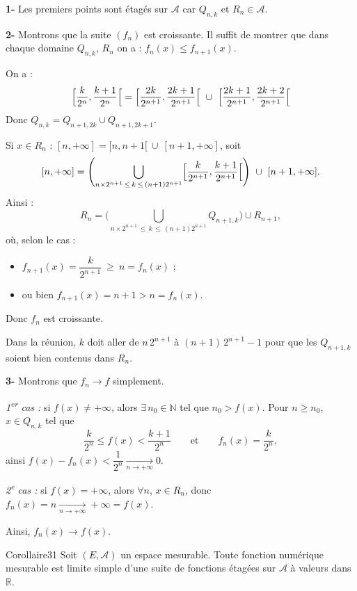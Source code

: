 \documentclass[11pt,a4paper]{article}
\newcommand{\R}{\mathbb{R}}
\newcommand{\N}{\mathbb{N}}
\newcommand{\A}{\mathscr{A}}
\begin{document}
\textbf{1-} Les premiers points sont étagés sur $\A$ car $Q_{n,k}$ et $R_n\in\A$.

\textbf{2-} Montrons que la suite $(f_n)$ est croissante. Il suffit de montrer que dans chaque domaine
$Q_{n,k}$, $R_n$ on a : $f_n(x)\le f_{n+1}(x)$.

On a :
\[
  \Bigl[\frac{k}{2^n},\frac{k+1}{2^n}\Bigr[
  =\Bigl[\frac{2k}{2^{n+1}},\frac{2k+1}{2^{n+1}}\Bigr[\ \cup\ \Bigl[\frac{2k+1}{2^{n+1}},\frac{2k+2}{2^{n+1}}\Bigr[
\]
Donc $Q_{n,k}=Q_{n+1,2k}\cup Q_{n+1,2k+1}$.

Si $x\in R_n$ : $[n,+\infty]=[n,n+1[\ \cup\ [n+1,+\infty]$, soit
\[
  [n,+\infty]=\Biggl(\bigcup_{n\times 2^{n+1}\,\le\,k\,\le\,(n+1)2^{n+1}}
  \Bigl[\frac{k}{2^{n+1}},\frac{k+1}{2^{n+1}}\Bigr[\Biggr)\ \cup\ [n+1,+\infty].
\]
Ainsi :
\[
  R_n=\Biggl(\bigcup_{n\times 2^{n+1}\,\le\,k\,\le\,(n+1)2^{n+1}} Q_{n+1,k}\Biggr)\cup R_{n+1},
\]
où, selon le cas :
\begin{itemize}[leftmargin=1.2cm]
  \item $f_{n+1}(x)=\dfrac{k}{2^{n+1}}\ \ge\ n=f_n(x)$ ;
  \item ou bien $f_{n+1}(x)=n+1>n=f_n(x)$.
\end{itemize}
Donc $f_n$ est croissante.

\begin{note}
Dans la réunion, $k$ doit aller de $n\,2^{n+1}$ à $(n+1)\,2^{n+1}-1$ pour que les $Q_{n+1,k}$
soient bien contenus dans $R_n$.
\end{note}

\textbf{3-} Montrons que $f_n\to f$ simplement.

\emph{1\textsuperscript{er} cas :} si $f(x)\neq+\infty$, alors $\exists\, n_0\in\N$ tel que $n_0>f(x)$.
Pour $n\ge n_0$, $x\in Q_{n,k}$ tel que
\[
  \frac{k}{2^n}\le f(x)<\frac{k+1}{2^n}\qquad\text{et}\qquad f_n(x)=\frac{k}{2^n},
\]
ainsi $f(x)-f_n(x)<\dfrac{1}{2^n}\xrightarrow[n\to+\infty]{}0$.

\emph{2\textsuperscript{e} cas :} si $f(x)=+\infty$, alors $\forall n$, $x\in R_n$, donc
$f_n(x)=n\xrightarrow[n\to+\infty]{}+\infty=f(x)$.

Ainsi, $f_n(x)\to f(x)$.

\begin{enonce}{Corollaire}{31}
Soit $(E,\A)$ un espace mesurable. Toute fonction numérique mesurable est limite simple
d'une suite de fonctions étagées sur $\A$ à valeurs dans $\R$.
\end{enonce}
\end{document}
